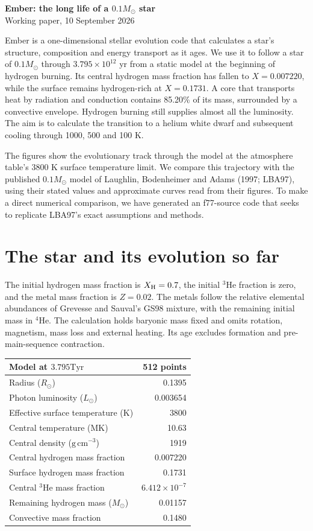 \documentclass[11pt,letterpaper]{article}
\newcommand{\Ms}{M_\odot}\newcommand{\Rs}{R_\odot}\newcommand{\Ls}{L_\odot}
\newcommand{\Tyr}{\mathrm{Tyr}}
\begin{document}
\begin{center}
{\Large\bfseries Ember: the long life of a $0.1\Ms$ star}\\[8pt]
{\small Working paper, 10 September 2026}
\end{center}

Ember is a one-dimensional stellar evolution code that calculates a star's
structure, composition and energy transport as it ages.
We use it to follow a star of $0.1\Ms$ through
$3.795\times10^{12}$ yr from a static model at the beginning of hydrogen
burning. Its central hydrogen mass fraction has fallen to $X=0.007220$, while the
surface remains hydrogen-rich at $X=0.1731$. A core that transports heat by
radiation and conduction contains 85.20\% of its mass, surrounded by a convective envelope. Hydrogen
burning still supplies almost all the luminosity. The aim is to calculate the
transition to a helium white dwarf and subsequent
cooling through 1000, 500 and 100 K.

The figures show the evolutionary track through the model at the atmosphere
table's 3800 K surface temperature limit.
We compare this trajectory with the published $0.1\Ms$ model of Laughlin,
Bodenheimer and Adams (1997; LBA97), using their stated values and approximate
curves read from their figures. To make a direct numerical comparison, we have
generated an f77-source code that seeks to replicate LBA97's exact assumptions
and methods.

\section{The star and its evolution so far}
The initial hydrogen mass fraction is $X_{\rm H}=0.7$, the initial $^3$He
fraction is zero, and the metal mass fraction is $Z=0.02$. The metals follow
the relative elemental abundances of Grevesse and Sauval's GS98 mixture, with
the remaining initial mass in $^4$He. The calculation holds baryonic mass fixed and omits rotation,
magnetism, mass loss and external heating. Its age excludes formation and
pre-main-sequence contraction.

\begin{center}\begin{tabular}{@{}lr@{}}\toprule
Model at $3.795\Tyr$ & 512 points \\\midrule
Radius ($\Rs$) & 0.1395 \\
Photon luminosity ($\Ls$) & 0.003654 \\
Effective surface temperature (K) & 3800 \\
Central temperature (MK) & 10.63 \\
Central density ($\mathrm{g\,cm^{-3}}$) & 1919 \\
Central hydrogen mass fraction & 0.007220 \\
Surface hydrogen mass fraction & 0.1731 \\
Central $^3$He mass fraction & $6.412\times10^{-7}$ \\
Remaining hydrogen mass ($\Ms$) & 0.01157 \\
Convective mass fraction & 0.1480 \\\bottomrule
\end{tabular}\end{center}
\end{document}
